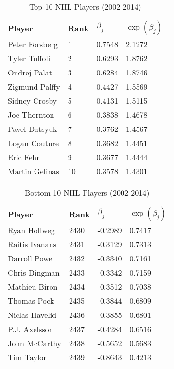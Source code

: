 \documentclass[11pt, fleqn]{article}
\begin{document}
\begin{table}[ht]
  \centering
  \begin{tabular}{l l l l}
    \hline
    Player & Rank & $\beta_j$ & $\exp(\beta_j)$ \\ 
    \hline
    Peter Forsberg &    1    &    0.7548 &    2.1272 \\  
    Tyler Toffoli  &    2    &    0.6293 &    1.8762 \\  
    Ondrej Palat   &    3    &    0.6284 &    1.8746 \\  
    Zigmund Palffy &    4    &    0.4427 &    1.5569 \\  
    Sidney Crosby  &    5    &    0.4131 &    1.5115 \\  
    Joe Thornton   &    6    &    0.3838 &    1.4678 \\  
    Pavel Datsyuk  &    7    &    0.3762 &    1.4567 \\  
    Logan Couture  &    8    &    0.3682 &    1.4451 \\  
    Eric Fehr      &    9    &    0.3677 &    1.4444 \\  
    Martin Gelinas &    10   &    0.3578 &    1.4301 \\   
    \hline
  \end{tabular}
\caption{Top 10 NHL Players (2002-2014)} 
\label{tab:10best}
\end{table}

\begin{table}[ht]
  \centering
  \begin{tabular}{l l l l}
    \hline
    Player & Rank & $\beta_j$ & $\exp(\beta_j)$ \\ 
    \hline
    Ryan Hollweg   &    2430 &    -0.2989 &    0.7417 \\  
    Raitis Ivanans &    2431 &    -0.3129 &    0.7313 \\  
    Darroll Powe   &    2432 &    -0.3340 &    0.7161 \\  
    Chris Dingman  &    2433 &    -0.3342 &    0.7159 \\  
    Mathieu Biron  &    2434 &    -0.3512 &    0.7038 \\  
    Thomas Pock    &    2435 &    -0.3844 &    0.6809 \\  
    Niclas Havelid &    2436 &    -0.3855 &    0.6801 \\  
    P.J. Axelsson &    2437 &    -0.4284 &    0.6516 \\  
    John McCarthy  &    2438 &    -0.5652 &    0.5683 \\  
    Tim Taylor     &    2439 &    -0.8643 &    0.4213 \\   
    \hline
  \end{tabular}
\caption{Bottom 10 NHL Players (2002-2014)} 
\label{tab:10worst}
\end{table}
\end{document}
